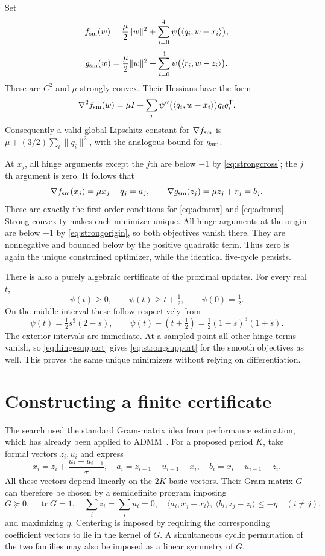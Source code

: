 \documentclass[11pt,a4paper]{article}
\theoremstyle{remark}
\newcommand{\ip}[2]{\langle #1,#2\rangle}
\newcommand{\norm}[1]{\lVert #1\rVert}
\begin{document}
Set
\begin{equation}\label{eq:smoothf}
f_{\rm sm}(w)=\frac\mu2\norm{w}^2+
\sum_{i=0}^4\psi\bigl(\ip{q_i}{w-x_i}\bigr),
\end{equation}
\begin{equation}\label{eq:smoothg}
g_{\rm sm}(w)=\frac\mu2\norm{w}^2+
\sum_{i=0}^4\psi\bigl(\ip{r_i}{w-z_i}\bigr).
\end{equation}
These are $C^2$ and $\mu$-strongly convex. Their Hessians have the form
\[
\nabla^2 f_{\rm sm}(w)=\mu I+
\sum_i\psi''\bigl(\ip{q_i}{w-x_i}\bigr)q_iq_i^\mathsf{T}.
\]
Consequently a valid global Lipschitz constant for $\nabla f_{\rm sm}$ is $\mu+(3/2)\sum_i\norm{q_i}^2$, with the analogous bound for $g_{\rm sm}$.

At $x_j$, all hinge arguments except the $j$th are below $-1$ by \eqref{eq:strongcross}; the $j$th argument is zero. It follows that
\[
\nabla f_{\rm sm}(x_j)=\mu x_j+q_j=a_j,
\qquad \nabla g_{\rm sm}(z_j)=\mu z_j+r_j=b_j.
\]
These are exactly the first-order conditions for \eqref{eq:admmx} and \eqref{eq:admmz}. Strong convexity makes each minimizer unique. All hinge arguments at the origin are below $-1$ by \eqref{eq:strongorigin}, so both objectives vanish there. They are nonnegative and bounded below by the positive quadratic term. Thus zero is again the unique constrained optimizer, while the identical five-cycle persists.

There is also a purely algebraic certificate of the proximal updates. For every real $t$,
\begin{equation}\label{eq:hingesupport}
\psi(t)\ge0,\qquad \psi(t)\ge t+\tfrac12,\qquad \psi(0)=\tfrac12.
\end{equation}
On the middle interval these follow respectively from
\[
\psi(t)=\tfrac12s^3(2-s),\qquad
\psi(t)-(t+\tfrac12)=\tfrac12(1-s)^3(1+s).
\]
The exterior intervals are immediate. At a sampled point all other hinge terms vanish, so \eqref{eq:hingesupport} gives \eqref{eq:strongsupport} for the smooth objectives as well. This proves the same unique minimizers without relying on differentiation.

\section{Constructing a finite certificate}
The search used the standard Gram-matrix idea from performance estimation, which has already been applied to ADMM~\cite{GuYang}. For a proposed period $K$, take formal vectors $z_i,u_i$ and express
\[
x_i=z_i+\frac{u_i-u_{i-1}}{\tau},\quad
a_i=z_{i-1}-u_{i-1}-x_i,\quad b_i=x_i+u_{i-1}-z_i.
\]
All these vectors depend linearly on the $2K$ basic vectors. Their Gram matrix $G$ can therefore be chosen by a semidefinite program imposing
\[
G\succeq0,\quad \operatorname{tr}G=1,\quad
\sum_i z_i=\sum_i u_i=0,\quad
\ip{a_i}{x_j-x_i},\ \ip{b_i}{z_j-z_i}\le-\eta\quad(i\ne j),
\]
and maximizing $\eta$. Centering is imposed by requiring the corresponding coefficient vectors to lie in the kernel of $G$. A simultaneous cyclic permutation of the two families may also be imposed as a linear symmetry of $G$.
\end{document}
